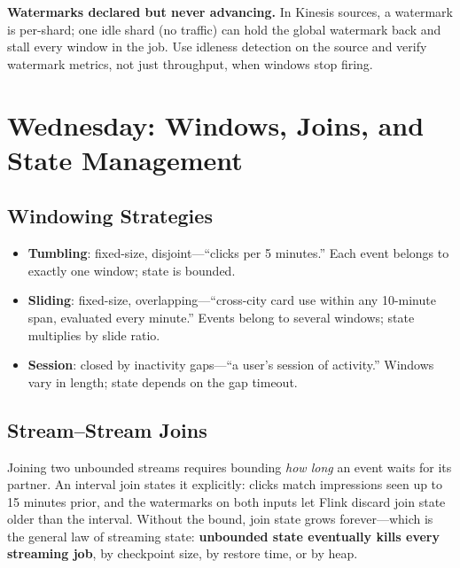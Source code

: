 \begin{pitfall}
\textbf{Watermarks declared but never advancing.} In Kinesis sources, a watermark is per-shard; one idle shard (no traffic) can hold the global watermark back and stall every window in the job. Use idleness detection on the source and verify watermark metrics, not just throughput, when windows stop firing.
\end{pitfall}

\section{Wednesday: Windows, Joins, and State Management}
\subsection{Windowing Strategies}
\begin{itemize}
    \item \textbf{Tumbling}: fixed-size, disjoint---``clicks per 5 minutes.'' Each event belongs to exactly one window; state is bounded.
    \item \textbf{Sliding}: fixed-size, overlapping---``cross-city card use within any 10-minute span, evaluated every minute.'' Events belong to several windows; state multiplies by slide ratio.
    \item \textbf{Session}: closed by inactivity gaps---``a user's session of activity.'' Windows vary in length; state depends on the gap timeout.
\end{itemize}

\subsection{Stream--Stream Joins}
Joining two unbounded streams requires bounding \emph{how long} an event waits for its partner. An interval join states it explicitly: clicks match impressions seen up to 15 minutes prior, and the watermarks on both inputs let Flink discard join state older than the interval. Without the bound, join state grows forever---which is the general law of streaming state: \textbf{unbounded state eventually kills every streaming job}, by checkpoint size, by restore time, or by heap.

